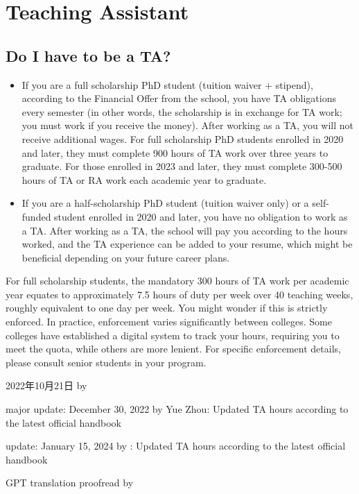 \section{Teaching Assistant}

\subsection{Do I have to be a TA?}
\begin{itemize}
    \item If you are a full scholarship PhD student (tuition waiver + stipend), according to the Financial Offer from the school, you have TA obligations every semester (in other words, the scholarship is in exchange for TA work; you must work if you receive the money). After working as a TA, you will not receive additional wages. For full scholarship PhD students enrolled in 2020 and later, they must complete 900 hours of TA work over three years to graduate. For those enrolled in 2023 and later, they must complete 300-500 hours of TA or RA work each academic year to graduate.
    \item If you are a half-scholarship PhD student (tuition waiver only) or a self-funded student enrolled in 2020 and later, you have no obligation to work as a TA. After working as a TA, the school will pay you according to the hours worked, and the TA experience can be added to your resume, which might be beneficial depending on your future career plans.
\end{itemize}

For full scholarship students, the mandatory 300 hours of TA work per academic year equates to approximately 7.5 hours of duty per week over 40 teaching weeks, roughly equivalent to one day per week. You might wonder if this is strictly enforced. In practice, enforcement varies significantly between colleges. Some colleges have established a digital system to track your hours, requiring you to meet the quota, while others are more lenient. For specific enforcement details, please consult senior students in your program.

\begin{flushright}
    2022年10月21日 by \Wu

    major update: December 30, 2022 by Yue Zhou: Updated TA hours according to the latest official handbook

    update: January 15, 2024 by \Wu : Updated TA hours according to the latest official handbook

    GPT translation proofread by \Shiyao
\end{flushright}

